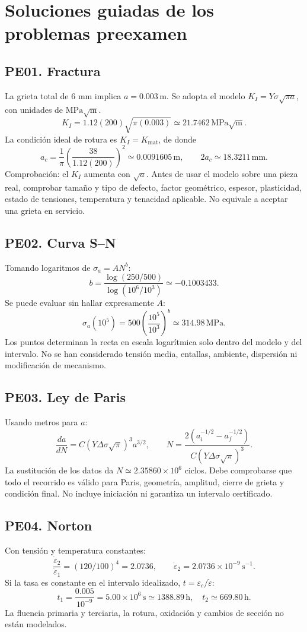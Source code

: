 \chapter{Soluciones guiadas de los problemas preexamen}
\label{ch:soluciones-problemas-preexamen}

\section*{PE01. Fractura}
La grieta total de 6 mm implica $a=0.003\,\mathrm m$. Se adopta el modelo $K_I=Y\sigma\sqrt{\pi a}$, con unidades de $\mathrm{MPa\sqrt m}$.
\[
K_I=1.12(200)\sqrt{\pi(0.003)}\simeq21.7462\,\mathrm{MPa\sqrt m}.
\]
La condición ideal de rotura es $K_I=K_{\mathrm{mat}}$, de donde
\[
a_c=\frac1{\pi}\left(\frac{38}{1.12(200)}\right)^2\simeq0.0091605\,\mathrm m,
\qquad 2a_c\simeq18.3211\,\mathrm{mm}.
\]
Comprobación: el $K_I$ aumenta con $\sqrt a$. Antes de usar el modelo sobre una pieza real, comprobar tamaño y tipo de defecto, factor geométrico, espesor, plasticidad, estado de tensiones, temperatura y tenacidad aplicable. No equivale a aceptar una grieta en servicio.

\section*{PE02. Curva S--N}
Tomando logaritmos de $\sigma_a=AN^b$:
\[
b=\frac{\log(250/500)}{\log(10^6/10^3)}\simeq-0.1003433.
\]
Se puede evaluar sin hallar expresamente $A$:
\[
\sigma_a(10^5)=500\left(\frac{10^5}{10^3}\right)^b\simeq314.98\,\mathrm{MPa}.
\]
Los puntos determinan la recta en escala logarítmica solo dentro del modelo y del intervalo. No se han considerado tensión media, entallas, ambiente, dispersión ni modificación de mecanismo.

\section*{PE03. Ley de Paris}
Usando metros para $a$:
\[
\frac{da}{dN}=C(Y\Delta\sigma\sqrt{\pi})^3a^{3/2},\qquad
N=\frac{2(a_i^{-1/2}-a_f^{-1/2})}{C(Y\Delta\sigma\sqrt\pi)^3}.
\]
La sustitución de los datos da $N\simeq2.35860\times10^6$ ciclos. Debe comprobarse que todo el recorrido es válido para Paris, geometría, amplitud, cierre de grieta y condición final. No incluye iniciación ni garantiza un intervalo certificado.

\section*{PE04. Norton}
Con tensión y temperatura constantes:
\[
\frac{\dot\varepsilon_2}{\dot\varepsilon_1}=(120/100)^4=2.0736,
\qquad \dot\varepsilon_2=2.0736\times10^{-9}\,\mathrm{s^{-1}}.
\]
Si la tasa es constante en el intervalo idealizado, $t=\varepsilon_c/\dot\varepsilon$:
\[
t_1=\frac{0.005}{10^{-9}}=5.00\times10^6\,\mathrm s\simeq1388.89\,\mathrm h,
\quad t_2\simeq669.80\,\mathrm h.
\]
La fluencia primaria y terciaria, la rotura, oxidación y cambios de sección no están modelados.

